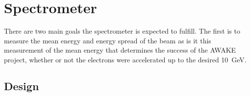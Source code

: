 
\section{Spectrometer}
\label{sec:spectrometer}

There are two main goals the spectrometer is expected to fulfill. The first is
to measure the mean energy and energy spread of the beam as is it this
measurement of the mean energy that determines the success of the AWAKE project,
whether or not the electrons were accelerated up to the desired
\SI{10}{\giga\electronvolt}.


\subsection{Design}


